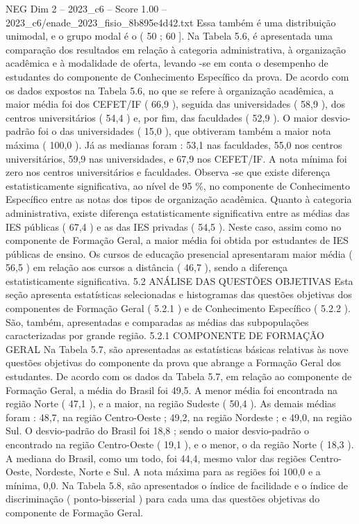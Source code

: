 \begin{textsample}{NEG Dim 2 – 2023\_c6 – Score 1.00 – 2023\_c6/enade\_2023\_fisio\_8b895e4d42.txt}
Essa também é uma distribuição unimodal, e o grupo modal é o ( 50 ; 60 ].
Na Tabela 5.6, é apresentada uma comparação dos resultados em relação à categoria administrativa, à organização acadêmica e à modalidade de oferta, levando -se em conta o desempenho de estudantes do componente de Conhecimento Específico da prova.
De acordo com os dados expostos na Tabela 5.6, no que se refere à organização acadêmica, a maior média foi dos CEFET/IF ( 66,9 ), seguida das universidades ( 58,9 ), dos centros universitários ( 54,4 ) e, por fim, das faculdades ( 52,9 ).
O maior desvio-padrão foi o das universidades ( 15,0 ), que obtiveram também a maior nota máxima ( 100,0 ).
Já as medianas foram : 53,1 nas faculdades, 55,0 nos centros universitários, 59,9 nas universidades, e 67,9 nos CEFET/IF.
A nota mínima foi zero nos centros universitários e faculdades.
Observa -se que existe diferença estatisticamente significativa, ao nível de 95 \%, no componente de Conhecimento Específico entre as notas dos tipos de organização acadêmica.
Quanto à categoria administrativa, existe diferença estatisticamente significativa entre as médias das IES públicas ( 67,4 ) e as das IES privadas ( 54,5 ).
Neste caso, assim como no componente de Formação Geral, a maior média foi obtida por estudantes de IES públicas de ensino.
Os cursos de educação presencial apresentaram maior média ( 56,5 ) em relação aos cursos a distância ( 46,7 ), sendo a diferença estatisticamente significativa. 5.2 ANÁLISE DAS QUESTÕES OBJETIVAS Esta seção apresenta estatísticas selecionadas e histogramas das questões objetivas dos componentes de Formação Geral ( 5.2.1 ) e de Conhecimento Específico ( 5.2.2 ).
São, também, apresentadas e comparadas as médias das subpopulações caracterizadas por grande região. 5.2.1 COMPONENTE DE FORMAÇÃO GERAL Na Tabela 5.7, são apresentadas as estatísticas básicas relativas às nove questões objetivas do componente da prova que abrange a Formação Geral dos estudantes.
De acordo com os dados da Tabela 5.7, em relação ao componente de Formação Geral, a média do Brasil foi 49,5.
A menor média foi encontrada na região Norte ( 47,1 ), e a maior, na região Sudeste ( 50,4 ).
As demais médias foram : 48,7, na região Centro-Oeste ; 49,2, na região Nordeste ; e 49,0, na região Sul.
O desvio-padrão do Brasil foi 18,8 ; sendo o maior desvio-padrão o encontrado na região Centro-Oeste ( 19,1 ), e o menor, o da região Norte ( 18,3 ).
A mediana do Brasil, como um todo, foi 44,4, mesmo valor das regiões Centro-Oeste, Nordeste, Norte e Sul.
A nota máxima para as regiões foi 100,0 e a mínima, 0,0.
Na Tabela 5.8, são apresentados o índice de facilidade e o índice de discriminação ( ponto-bisserial ) para cada uma das questões objetivas do componente de Formação Geral.

\end{textsample}
